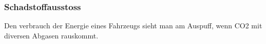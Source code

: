 \subsubsection{Schadstoffausstoss}
\label{subsec:schadstoffausstoss}

Den verbrauch der Energie eines Fahrzeugs sieht man am Auspuff, wenn CO2 mit diversen Abgasen rauskommt. 

\clearpage %